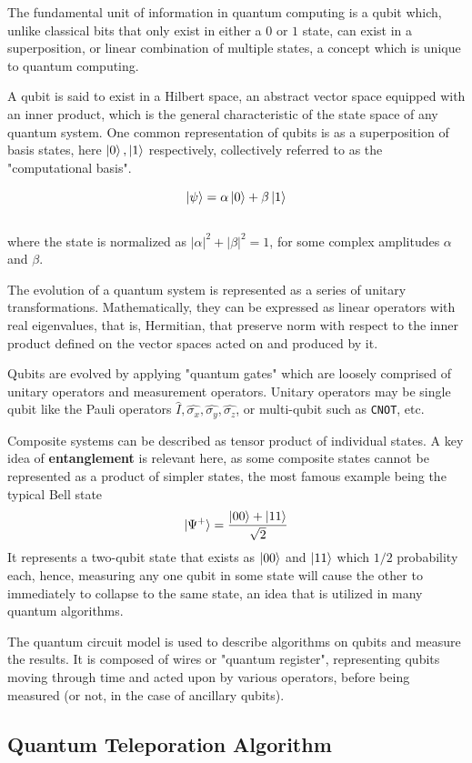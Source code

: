 \documentclass[11pt,a4paper]{article}
\begin{document}
The fundamental unit of information in quantum computing is a qubit which, unlike classical bits that only exist in either a $0$ or $1$ state, can exist in a superposition, or linear combination of multiple states, a concept which is unique to quantum computing.

A qubit is said to exist in a Hilbert space, an abstract vector space equipped with an inner product, which is the general characteristic of the state space of any quantum system. One common representation of qubits is as a superposition of basis states, here $\ket{0}, \ket{1}$ respectively, collectively referred to as the "computational basis".

$$\ket{\psi} = \alpha\ket{0} + \beta\ket{1}$$ \\
where the state is normalized as $|\alpha|^2 + |\beta|^2 = 1$, for some complex amplitudes $\alpha$ and $\beta$.

The evolution of a quantum system is represented as a series of unitary transformations. Mathematically, they can be expressed as linear operators with real eigenvalues, that is, Hermitian, that preserve norm with respect to the inner product defined on the vector spaces acted on and produced by it.

Qubits are evolved by applying "quantum gates" which are loosely comprised of unitary operators and measurement operators. Unitary operators may be single qubit like the Pauli operators $\hat{I}, \hat{\sigma_x}, \hat{\sigma_y}, \hat{\sigma_z}$, or multi-qubit such as \texttt{CNOT}, etc.

Composite systems can be described as tensor product of individual states. A key idea of \textbf{entanglement} is relevant here, as some composite states cannot be represented as a product of simpler states, the most famous example being the typical Bell state
$$\ket{\Psi^+} = \frac{\ket{00} + \ket{11}}{\sqrt{2}}$$
It represents a two-qubit state that exists as $\ket{00}$ and $\ket{11}$ which $1/2$ probability each, hence, measuring any one qubit in some state will cause the other to immediately to collapse to the same state, an idea that is utilized in many quantum algorithms.

The quantum circuit model is used to describe algorithms on qubits and measure the results. It is composed of wires or "quantum register", representing qubits moving through time and acted upon by various operators, before being measured (or not, in the case of ancillary qubits).

\subsection{Quantum Teleporation Algorithm}
\end{document}
